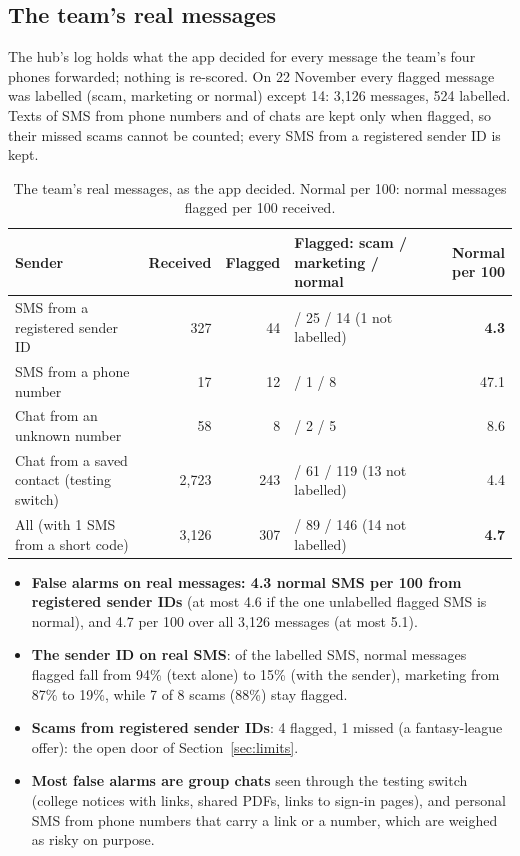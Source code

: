 \documentclass[11pt,a4paper]{article}
\begin{document}
\subsection{The team's real messages}
\label{sec:real}

The hub's log holds what the app decided for every message the team's four phones forwarded; nothing is re-scored.
On 22 November every flagged message was labelled (scam, marketing or normal) except 14: 3,126 messages, 524 labelled.
Texts of SMS from phone numbers and of chats are kept only when flagged, so their missed scams cannot be counted;
every SMS from a registered sender ID is kept.

\begin{table}[H]
\centering\small
\begin{tabularx}{\textwidth}{@{}>{\raggedright\arraybackslash}X r r >{\raggedright\arraybackslash}p{3.6cm} r@{}}
\toprule
\textbf{Sender} & \textbf{Received} & \textbf{Flagged} & \textbf{Flagged: scam / marketing / normal} & \textbf{Normal per 100}\\
\midrule
SMS from a registered sender ID & 327 & 44 & 4 / 25 / 14 (1 not labelled) & \textbf{4.3}\\
SMS from a phone number & 17 & 12 & 3 / 1 / 8 & 47.1\\
Chat from an unknown number & 58 & 8 & 1 / 2 / 5 & 8.6\\
Chat from a saved contact (testing switch) & 2,723 & 243 & 50 / 61 / 119 (13 not labelled) & 4.4\\
All (with 1 SMS from a short code) & 3,126 & 307 & 58 / 89 / 146 (14 not labelled) & \textbf{4.7}\\
\bottomrule
\end{tabularx}
\caption{The team's real messages, as the app decided. Normal per 100: normal messages flagged per 100 received.}
\label{tab:real}
\end{table}

\begin{itemize}
  \item \textbf{False alarms on real messages: 4.3 normal SMS per 100 from registered sender IDs} (at most 4.6 if the
        one unlabelled flagged SMS is normal), and 4.7 per 100 over all 3,126 messages (at most 5.1).
  \item \textbf{The sender ID on real SMS}: of the labelled SMS, normal messages flagged fall from 94\% (text alone) to
        15\% (with the sender), marketing from 87\% to 19\%, while 7 of 8 scams (88\%) stay flagged.
  \item \textbf{Scams from registered sender IDs}: 4 flagged, 1 missed (a fantasy-league offer): the open door of
        Section~\ref{sec:limits}.
  \item \textbf{Most false alarms are group chats} seen through the testing switch (college notices with links, shared
        PDFs, links to sign-in pages), and personal SMS from phone numbers that carry a link or a number, which are weighed
        as risky on purpose.
\end{itemize}
\end{document}
